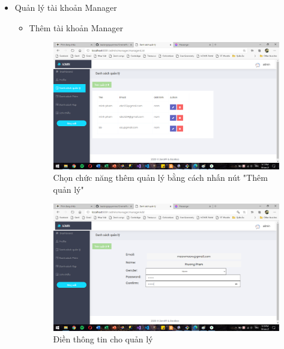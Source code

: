 \documentclass[a4paper, 12pt]{article}
\begin{document}
\begin{itemize}
	\item Quản lý tài khoản Manager
	\begin{itemize}
		\item Thêm tài khoản Manager
			\begin{figure}[H]
				\begin{center}
					\includegraphics[scale=0.5]{./image/demo_adminAddManager.png}
					\caption{Chọn chức năng thêm quản lý bằng cách nhấn nút "Thêm quản lý"}
				\end{center}
			\end{figure}
	
			\begin{figure}[H]
				\begin{center}
					\includegraphics[scale=0.5]{./image/demo_adminAddManager2.png}
					\caption{Điền thông tin cho quản lý}
				\end{center}
			\end{figure}
	

\end{itemize}
\end{itemize}
\end{document}
